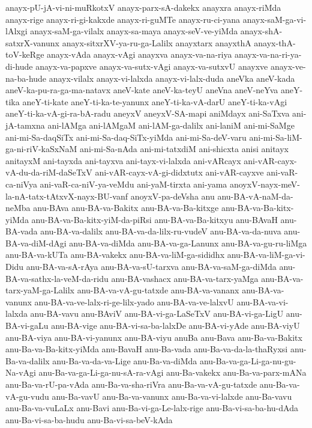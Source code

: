 {anayx-pU-jA-vi-ni-muRkotxV
anayx-parx-sA-dakekx
anayxra
anayx-riMda
anayx-rige
anayx-ri-gi-kakxde
anayx-ri-guMTe
anayx-ru-ci-yana
anayx-saM-ga-vi-lAlxgi
anayx-saM-ga-vilalx
anayx-sa-maya
anayx-seV-ve-yiMda
anayx-shA-satxrX-vanunx
anayx-sitxrXV-ya-ru-ga-Lalilx
anayxtarx
anayxthA
anayx-thA-toV-keRge
anayx-vAda
anayx-vAgi
anayxva
anayx-va-na-riya
anayx-va-na-ri-ya-di-hude
anayx-va-papxve
anayx-va-sutx-vAgi
anayx-va-sutxvU
anayxve
anayx-ve-na-ba-hude
anayx-vilalx
anayx-vi-lalxda
anayx-vi-lalx-duda
aneVka
aneV-kada
aneV-ka-pu-ra-ga-ma-natavx
aneV-kate
aneV-ka-teyU
aneVna
aneV-neYva
aneY-tika
aneY-ti-kate
aneY-ti-ka-te-yanunx
aneY-ti-ka-vA-darU
aneY-ti-ka-vAgi
aneY-ti-ka-vA-gi-ra-bA-radu
aneyxV
aneyxV-SA-mapi
aniMdayx
ani-SaTxva
ani-jA-tamxna
ani-lAMga
ani-lAMgaM
ani-lAM-ga-dalilx
ani-laniM
ani-mi-SaMge
ani-mi-Sa-daqSiTx
ani-mi-Sa-daq-SiTx-yiMda
ani-mi-Sa-deV-varu
ani-mi-Sa-liM-ga-ni-riV-kaSxNaM
ani-mi-Sa-nAda
ani-mi-tatxdiM
ani-shicxta
anisi
anitayx
anitayxM
ani-tayxda
ani-tayxva
ani-tayx-vi-lalxda
ani-vARcayx
ani-vAR-cayx-vA-du-da-riM-daSeTxV
ani-vAR-cayx-vA-gi-didxtutx
ani-vAR-cayxve
ani-vaR-ca-niVya
ani-vaR-ca-niV-ya-veMdu
ani-yaM-tirxta
ani-yama
anoyxV-nayx-meV-la-nA-tatx-tAtxvX-nayx-BU-vanf
anoyxV-pa-deVsha
anu
anu-BA-vA-naM-da-neMba
anu-BAva
anu-BA-va-Bakitx
anu-BA-va-Ba-kitxge
anu-BA-va-Ba-kitx-yiMda
anu-BA-va-Ba-kitx-yiM-da-piRsi
anu-BA-va-Ba-kitxyu
anu-BAvaH
anu-BA-vada
anu-BA-va-dalilx
anu-BA-va-da-lilx-ru-vudeV
anu-BA-va-da-nuva
anu-BA-va-diM-dAgi
anu-BA-va-diMda
anu-BA-va-ga-Lanunx
anu-BA-va-gu-ru-liMga
anu-BA-va-kUTa
anu-BA-vakekx
anu-BA-va-liM-ga-sididhx
anu-BA-va-liM-ga-vi-Didu
anu-BA-va-sA-rAya
anu-BA-va-sU-tarxva
anu-BA-va-saM-ga-diMda
anu-BA-va-sathx-la-veM-da-ridu
anu-BA-vashacx
anu-BA-va-tarx-yaMga
anu-BA-va-tarx-yaM-ga-Lalilx
anu-BA-va-vA-gu-tatxde
anu-BA-va-vananx
anu-BA-va-vanunx
anu-BA-va-ve-lalx-ri-ge-lilx-yado
anu-BA-va-ve-lalxvU
anu-BA-va-vi-lalxda
anu-BA-vavu
anu-BAviV
anu-BA-vi-ga-LaSeTxV
anu-BA-vi-ga-LigU
anu-BA-vi-gaLu
anu-BA-vige
anu-BA-vi-sa-ba-lalxDe
anu-BA-vi-yAde
anu-BA-viyU
anu-BA-viya
anu-BA-vi-yanunx
anu-BA-viyu
anuBa
anu-Bava
anu-Ba-va-Bakitx
anu-Ba-va-Ba-kitx-yiMda
anu-BavaH
anu-Ba-vada
anu-Ba-va-da-la-thaRyxsi
anu-Ba-va-dalilx
anu-Ba-va-da-va-Lige
anu-Ba-va-diMda
anu-Ba-va-ga-Li-ga-nu-gu-Na-vAgi
anu-Ba-va-ga-Li-ga-nu-sA-ra-vAgi
anu-Ba-vakekx
anu-Ba-va-parx-mANa
anu-Ba-va-rU-pa-vAda
anu-Ba-va-sha-riVra
anu-Ba-va-vA-gu-tatxde
anu-Ba-va-vA-gu-vudu
anu-Ba-vavU
anu-Ba-va-vanunx
anu-Ba-va-vi-lalxde
anu-Ba-vavu
anu-Ba-va-vuLaLx
anu-Bavi
anu-Ba-vi-ga-Le-lalx-rige
anu-Ba-vi-sa-ba-hu-dAda
anu-Ba-vi-sa-ba-hudu
anu-Ba-vi-sa-beV-kAda
}
